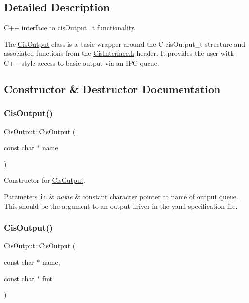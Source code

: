 \subsection{Detailed Description}
C++ interface to cis\+Output\+\_\+t functionality. 

The \mbox{\hyperlink{classCisOutput}{Cis\+Output}} class is a basic wrapper around the C cis\+Output\+\_\+t structure and associated functions from the \mbox{\hyperlink{CisInterface_8h_source}{Cis\+Interface.\+h}} header. It provides the user with C++ style access to basic output via an I\+PC queue. 

\subsection{Constructor \& Destructor Documentation}
\mbox{\label{classCisOutput_acbe5281010e3dd4617006a03d9c6c06c}} 
\subsubsection{\texorpdfstring{Cis\+Output()}{CisOutput()}\hspace{0.1cm}{\footnotesize\ttfamily [1/2]}}
{\footnotesize\ttfamily Cis\+Output\+::\+Cis\+Output (\begin{DoxyParamCaption}\item[{const char $\ast$}]{name }\end{DoxyParamCaption})\hspace{0.3cm}{\ttfamily [inline]}}



Constructor for \mbox{\hyperlink{classCisOutput}{Cis\+Output}}. 


\begin{DoxyParams}[1]{Parameters}
\mbox{\tt in}  & {\em name} & constant character pointer to name of output queue. This should be the argument to an output driver in the yaml specification file. \\
\hline
\end{DoxyParams}
\mbox{\label{classCisOutput_a276eaee68d97cba54726752784d6c4df}} 
\subsubsection{\texorpdfstring{Cis\+Output()}{CisOutput()}\hspace{0.1cm}{\footnotesize\ttfamily [2/2]}}
{\footnotesize\ttfamily Cis\+Output\+::\+Cis\+Output (\begin{DoxyParamCaption}\item[{const char $\ast$}]{name,  }\item[{const char $\ast$}]{fmt }\end{DoxyParamCaption})\hspace{0.3cm}{\ttfamily [inline]}}



